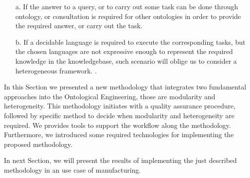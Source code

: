 \begin{enumerate}
\begin{enumerate}
		\item[a.] If the answer to a query, or to carry out some task can  be done  through ontology, or consultation is required  for other ontologies in order to provide the required answer, or carry out the task.   
		
		\item[b.] If a decidable language is required to  execute  the corresponding tasks, but the chosen languages are not expressive enough to represent the required knowledge in the knowledgebase, such scenario will oblige us to consider a  heterogeneous framework. .  
		
	\end{enumerate}
	
\end{enumerate}


In this Section we presented a new methodology that integrates two fundamental approaches into the Ontological Engineering, those are modularity and heterogeneity. This methodology initiates with a quality assurance procedure, followed by specific method to decide when modularity and heterogeneity are required. We provides tools to support the workflow along the methodology. Furthermore,  we introduced some required technologies for implementing the proposed methodology. 

In next Section, we will present the results of implementing the just described methodology in an use case of manufacturing.